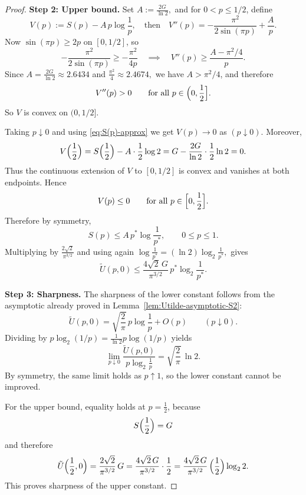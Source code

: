 \documentclass[10pt,a4paper]{amsart}
\begin{document}
\begin{proof}
\textbf{Step 2: Upper bound.}
Set
$
A:=\frac{2G}{\ln2},
$
and for $0<p\le 1/2$, define
\[
V(p):=S(p)-A\,p\log\frac1p,
\quad 
\text{then}
\quad 
V''(p)
=
-\frac{\pi^2}{2\sin(\pi p)}+\frac{A}{p}.
\]
Now $\sin(\pi p)\ge 2p$ on $[0,1/2]$, so
\[
-\frac{\pi^2}{2\sin(\pi p)}
\ge
-\frac{\pi^2}{4p}
\quad 
\implies
\quad 
V''(p)\ge \frac{A-\pi^2/4}{p}.
\]
Since
$
A=\frac{2G}{\ln2}\approx 2.6434
$ and $
\frac{\pi^2}{4}\approx 2.4674,
$
we have $A>\pi^2/4$, and therefore
\[
V''(p)>0
\qquad\text{for all } p\in\Bigl(0,\frac12\Bigr].
\]
So $V$ is convex on $(0,1/2]$.


Taking $ p\downarrow0$ and using \eqref{eq:S(p)-approx} we get
$
V(p)\to 0
$ as $ (p\downarrow0).
$
Moreover,
\[
V\Bigl(\frac12\Bigr)
=
S\Bigl(\frac12\Bigr)-A\cdot \frac12\log2
=
G-\frac{2G}{\ln2}\cdot \frac12\ln2
=
0.
\]
Thus the continuous extension of $V$ to $[0,1/2]$ is convex and vanishes at both endpoints. Hence 
\[
V(p)\le 0
\qquad \text{for all } p\in\Bigl[0,\frac12\Bigr].
\]
Therefore
by symmetry,
\[
S(p)\le A\,p^*\log\frac1{p^*},
\qquad 0\le p\le 1.
\]
Multiplying by $\frac{2\sqrt2}{\pi^{3/2}}$ and using again
$
\log\frac1{p^*}=(\ln2)\log_2\frac1{p^*},
$
gives
\[
\tilde U(p,0)
\le
\frac{4\sqrt2\,G}{\pi^{3/2}}\,p^*\log_2\frac1{p^*}.
\]

\textbf{Step 3: Sharpness.}
The sharpness of the lower constant follows from the asymptotic already proved in Lemma~\ref{lem:Utilde-asymptotic-S2}:
\[
\tilde U(p,0)
=
\sqrt{\frac2\pi}\,p\log\frac1p+O(p)
\qquad (p\downarrow0).
\]
Dividing by $p\log_2(1/p)=\frac{1}{\ln2}p\log(1/p)$ yields
\[
\lim_{p\downarrow0}
\frac{\tilde U(p,0)}{p\log_2\frac1p}
=
\sqrt{\frac2\pi}\,\ln2.
\]
By symmetry, the same limit holds as $p\uparrow1$, so the lower constant cannot be improved.

For the upper bound, equality holds at $p=\frac12$, because
\[
S\Bigl(\frac12\Bigr)=G
\]
and therefore
\[
\tilde U\Bigl(\frac12,0\Bigr)
=
\frac{2\sqrt2}{\pi^{3/2}}\,G
=
\frac{4\sqrt2\,G}{\pi^{3/2}}\cdot \frac12
=
\frac{4\sqrt2\,G}{\pi^{3/2}}\,
\Bigl(\frac12\Bigr)\log_2 2.
\]
This proves sharpness of the upper constant.
\end{proof}
\end{document}
